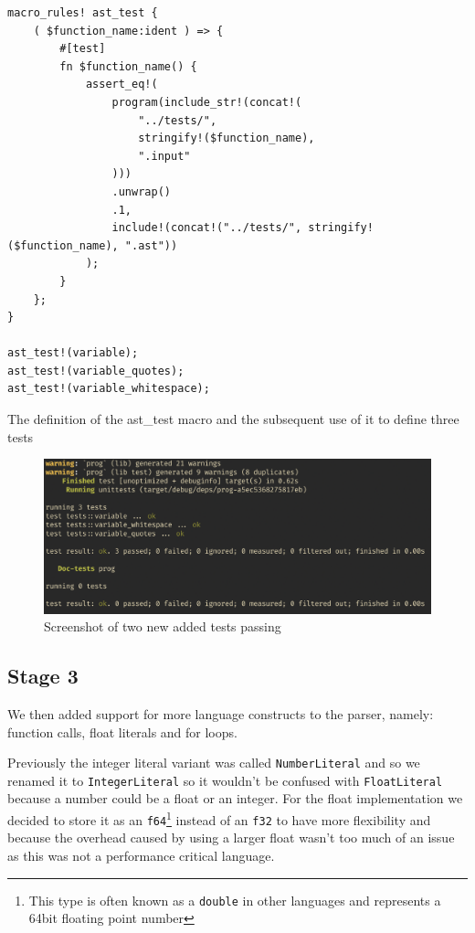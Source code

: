 \documentclass{article}
\begin{document}
\begin{listing}
	\begin{verbatim}
macro_rules! ast_test {
	( $function_name:ident ) => {
		#[test]
		fn $function_name() {
			assert_eq!(
				program(include_str!(concat!(
					"../tests/",
					stringify!($function_name),
					".input"
				)))
				.unwrap()
				.1,
				include!(concat!("../tests/", stringify!($function_name), ".ast"))
			);
		}
	};
}

ast_test!(variable);
ast_test!(variable_quotes);
ast_test!(variable_whitespace);
	\end{verbatim}
	\caption{The definition of the ast\_test macro and the subsequent use of
	it to define three tests}
	\label{lst:macro_test}
\end{listing}

\begin{figure}
	\includegraphics[width=\textwidth]{stage2_test}
	\caption{Screenshot of two new added tests passing}
	\label{fig:stage2_test}
\end{figure}

\subsection{Stage 3}

We then added support for more language constructs to the parser, namely:
function calls, float literals and for loops.

Previously the integer literal variant was called \texttt{NumberLiteral} and so
we renamed it to \texttt{IntegerLiteral} so it wouldn't be confused with
\texttt{FloatLiteral} because a number could be a float or an integer. For the
float implementation we decided to store it as an \texttt{f64}\footnote{This
type is often known as a \texttt{double} in other languages and represents a
64bit floating point number} instead of an \texttt{f32} to have more
flexibility and because the overhead caused by using a larger float wasn't too
much of an issue as this was not a performance critical language.
\end{document}
